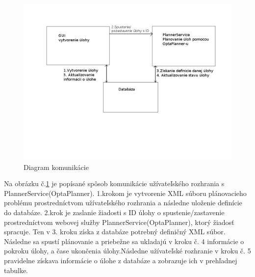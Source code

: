 \begin{figure}[htb]

\begin{center}

\includegraphics[scale=0.7]{work.jpg} 
\caption{Diagram komunikácie}
\label{work}

\end{center}

\end{figure}
Na obrázku č.\ref{work} je popísané spôsob komunikácie užívateľského rozhrania s PlannerService(OptaPlanner). 1.krokom je vytvorenie XML súboru plánovacieho problému prostredníctvom užívateľského rozhrania a následne uloženie definície do databáze. 2.krok je zaslanie žiadosti s ID úlohy o spustenie/zastavenie prostredníctvom webovej služby PlannerService(OptaPlanner), ktorý žiadosť spracuje. Ten v 3. kroku získa z databáze potrebný definičný XML súbor. Následne sa spustí plánovanie a priebežne sa ukladajú v kroku č. 4 informácie o pokroku úlohy, a čase ukončenia úlohy.Následne užívateľské rozhranie v kroku č. 5 pravidelne získava informácie o úlohe z databáze a zobrazuje ich v prehľadnej tabulke.


